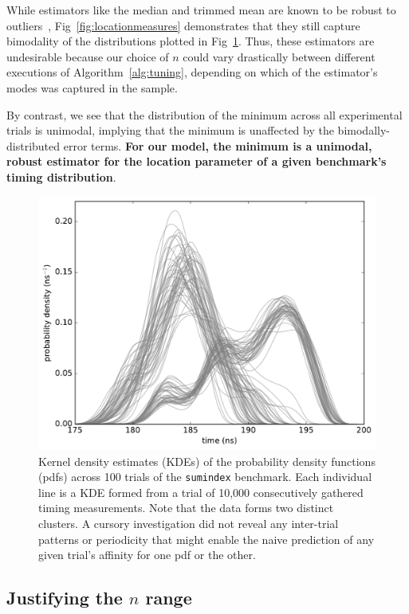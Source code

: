 \documentclass[conference]{IEEEtran}
\begin{document}
While estimators like the median and trimmed mean are known to be robust to
outliers~\cite{Maronna2006}, Fig~\ref{fig:locationmeasures} demonstrates that they still
capture bimodality of the distributions plotted in Fig~\ref{fig:pdfsumindex}. Thus, these
estimators are undesirable because our choice of $n$ could vary drastically between
different executions of Algorithm~\ref{alg:tuning}, depending on which of the estimator's
modes was captured in the sample.

By contrast, we see that the distribution of the minimum across all experimental trials is
unimodal, implying that the minimum is unaffected by the bimodally-distributed error terms.
\textbf{For our model, the minimum is a unimodal, robust estimator for the location
parameter of a given benchmark's timing distribution}.

\begin{figure}
\centering
\includegraphics[width=\columnwidth]{figures/fig4/kde_pdf_sumindex}
\caption{Kernel density estimates (KDEs) of the probability density functions (pdfs)
across 100 trials of the \lstinline|sumindex| benchmark. Each individual line is
a KDE formed from a trial of 10,000 consecutively gathered timing measurements. Note that
the data forms two distinct clusters. A cursory investigation did not reveal any inter-trial
patterns or periodicity that might enable the naive prediction of any given trial's affinity
for one pdf or the other.}
\label{fig:pdfsumindex}
\end{figure}

\subsection{Justifying the $n$ range}
\end{document}
